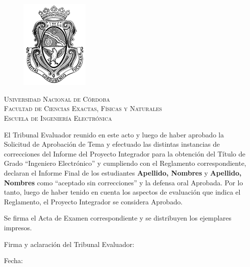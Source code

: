 \chapter*{}
\begin{center}
	
	\begin{figure}[h]
		\begin{center}
			\includegraphics[scale=0.8]{logo_unc.png}
		\end{center}
	\end{figure}
	\vspace{0.25em}
	
	\textsc{\LARGE Universidad Nacional de Córdoba}\\[0.3cm] %
	\textsc{\large Facultad de Ciencias Exactas, Físicas y Naturales}\\[0.3cm] %
	\textsc{\large Escuela de Ingeniería Electrónica}\\[0.75cm] %
\end{center}


El Tribunal Evaluador reunido en este acto y luego de haber aprobado la Solicitud de Aprobación de Tema 
y efectuado las distintas instancias de correcciones del Informe del Proyecto Integrador para la obtención 
del Título de Grado “Ingeniero Electrónico” y cumpliendo con el Reglamento correspondiente, declaran el Informe 
Final de los estudiantes \textbf{Apellido, Nombres} y \textbf{Apellido, Nombres} como “aceptado sin correcciones” 
y la defensa oral Aprobada. Por lo tanto, luego de haber tenido en cuenta los aspectos de evaluación que indica el 
Reglamento, el Proyecto Integrador se considera Aprobado. 

\vspace{0.5cm}

\par Se firma el Acta de Examen correspondiente y se distribuyen los ejemplares impresos.

\vspace{4.5cm}

Firma y aclaración del Tribunal Evaluador:

\vspace{0.5cm}

Fecha:

\clearpage{\thispagestyle{empty}\cleardoublepage}       %